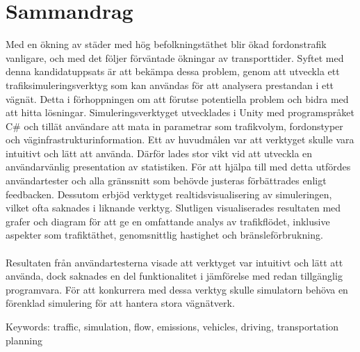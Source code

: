 \section*{Sammandrag}
    Med en ökning av städer med hög befolkningstäthet blir ökad fordonstrafik vanligare, och med det följer förväntade ökningar av transporttider. Syftet med denna kandidatuppsats är att bekämpa dessa problem, genom att utveckla ett trafiksimuleringsverktyg som kan användas för att analysera prestandan i ett vägnät. Detta i förhoppningen om att förutse potentiella problem och bidra med att hitta lösningar. Simuleringsverktyget utvecklades i Unity med programspråket C\# och tillät användare att mata in parametrar som trafikvolym, fordonstyper och väginfrastrukturinformation. Ett av huvudmålen var att verktyget skulle vara intuitivt och lätt att använda. Därför lades stor vikt vid att utveckla en användarvänlig presentation av statistiken. För att hjälpa till med detta utfördes användartester och alla gränssnitt som behövde justeras förbättrades enligt feedbacken. Dessutom erbjöd verktyget realtidsvisualisering av simuleringen, vilket ofta saknades i liknande verktyg. Slutligen visualiserades resultaten med grafer och diagram för att ge en omfattande analys av trafikflödet, inklusive aspekter som trafiktäthet, genomsnittlig hastighet och bränsleförbrukning. 
    \\\\
    Resultaten från användartesterna visade att verktyget var intuitivt och lätt att använda, dock saknades en del funktionalitet i jämförelse med redan tillgänglig programvara. För att konkurrera med dessa verktyg skulle simulatorn behöva en förenklad simulering för att hantera stora vägnätverk.


\vfill
Keywords: traffic, simulation, flow, emissions, vehicles, driving, transportation planning

\newpage
\thispagestyle{empty}
\mbox{}